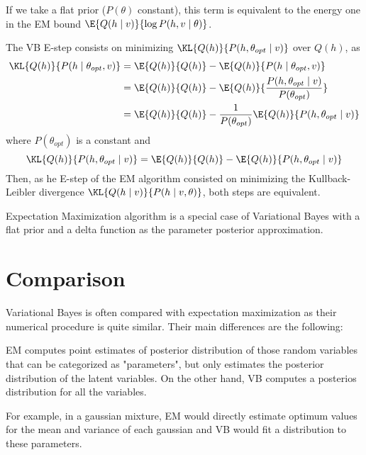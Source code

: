 If we take a flat prior (\(P(\theta) \)  constant), this term is equivalent to the energy one in the EM bound \(\E{Q(h\mid v)}{\log{P(h,v \mid \theta)}}\).

The VB E-step consists on minimizing \(\KL{Q(h)}{P(h,\theta_{opt} \mid v)}\) over \(Q(h)\), as
\[
  \begin{aligned}
    \KL{Q(h)}{P(h\mid \theta_{opt}, v)} &= \E{Q(h)}{Q(h)} - \E{Q(h)}{P(h \mid \theta_{opt}, v)} \\
    &= \E{Q(h)}{Q(h)} - \E{Q(h)}{\frac{P(h, \theta_{opt} \mid v)}{P(\theta_{opt})}}  \\
    &= \E{Q(h)}{Q(h)} - \frac{1}{P(\theta_{opt})}\E{Q(h)}{P(h, \theta_{opt} \mid v)}
\end{aligned}
\]
where \(P(\theta_{opt})\) is a constant and
\[
\KL{Q(h)}{P(h, \theta_{opt} \mid v)} = \E{Q(h)}{Q(h)} - \E{Q(h)}{P(h, \theta_{opt} \mid v)}
\]
Then, as  he E-step of the EM algorithm consisted on minimizing the Kullback-Leibler divergence \(\KL{Q(h \mid v)}{P(h \mid v, \theta)}\), both steps are equivalent.

\begin{remark}
  Expectation Maximization algorithm is a special case of Variational Bayes with a flat prior and a delta function as the parameter posterior approximation.
\end{remark}

\section{Comparison}
Variational Bayes is often compared with expectation maximization as their numerical procedure is quite similar. Their main differences are the following:

EM computes point estimates of posterior distribution of those random variables that can be categorized as "parameters", but only estimates the posterior distribution of the latent variables. On the other hand, VB computes a posterios distribution for all the variables.

For example, in a gaussian mixture, EM would directly estimate optimum values for the mean and variance of each gaussian and VB would fit a distribution to these parameters.